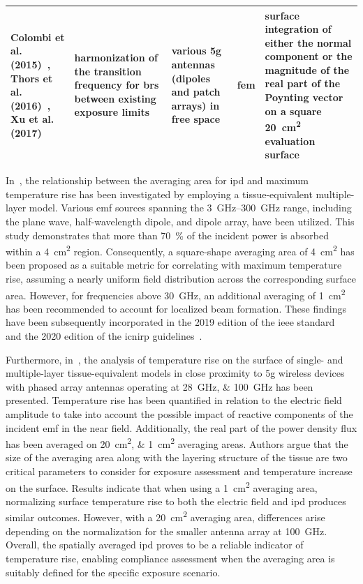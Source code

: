 \begin{table}
\begin{center}
\begin{tabularx}{\textwidth}{|X|X|X|X|X|}
\hline
Colombi et al. (2015)~\cite{Colombi2015Implications}, Thors et al. (2016)~\cite{Thors2016Exposure}, Xu et al. (2017)~\cite{Xu2017Understanding} & harmonization of the transition frequency for \gls{br}s between existing exposure limits & various \gls{5g} antennas (dipoles and patch arrays) in free space & \gls{fem} & surface integration of either the normal component or the magnitude of the real part of the Poynting vector on a square \SI{20}{\cm\squared} evaluation surface\\
\hline
\end{tabularx}
\end{center}
\end{table}

In~\cite{Hashimoto2017averaging}, the relationship between the averaging area for \gls{ipd} and maximum temperature rise has been investigated by employing a tissue-equivalent multiple-layer model.
Various \gls{emf} sources spanning the \SIrange{3}{300}{\GHz} range, including the plane wave, half-wavelength dipole, and dipole array, have been utilized.
This study demonstrates that more than \SI{70}{\percent} of the incident power is absorbed within a \SI{4}{\cm\squared} region.
Consequently, a square-shape averaging area of \SI{4}{\cm\squared} has been proposed as a suitable metric for correlating with maximum temperature rise, assuming a nearly uniform field distribution across the corresponding surface area.
However, for frequencies above \SI{30}{\GHz}, an additional averaging of \SI{1}{\cm\squared} has been recommended to account for localized beam formation.
These findings have been subsequently incorporated in the 2019 edition of the \gls{ieee} standard~\cite{IEEE2019Standard} and the 2020 edition of the \gls{icnirp} guidelines~\cite{ICNIRP2020Guidelines}.

Furthermore, in~\cite{Christ2018Thermal}, the analysis of temperature rise on the surface of single- and multiple-layer tissue-equivalent models in close proximity to \gls{5g} wireless devices with phased array antennas operating at \SIlist{28;100}{\GHz} has been presented.
Temperature rise has been quantified in relation to the electric field amplitude to take into account the possible impact of reactive components of the incident \gls{emf} in the near field.
Additionally, the real part of the power density flux has been averaged on \SIlist{20;1}{\cm\squared} averaging areas.
Authors argue that the size of the averaging area along with the layering structure of the tissue are two critical parameters to consider for exposure assessment and temperature increase on the surface.
Results indicate that when using a \SI{1}{\cm\squared} averaging area, normalizing surface temperature rise to both the electric field and \gls{ipd} produces similar outcomes.
However, with a \SI{20}{\cm\squared} averaging area, differences arise depending on the normalization for the smaller antenna array at \SI{100}{\GHz}.
Overall, the spatially averaged \gls{ipd} proves to be a reliable indicator of temperature rise, enabling compliance assessment when the averaging area is suitably defined for the specific exposure scenario.

